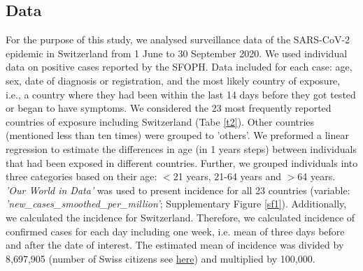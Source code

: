 \documentclass[10pt, a4paper, twoside]{article}
\begin{document}
\begin{multicols}{2}
\subsection{Data}
For the purpose of this study, we analysed surveillance data of the SARS-CoV-2 epidemic in Switzerland from 1 June to 30 September 2020. 
We used individual data on positive cases reported by the SFOPH. 
Data included for each case: age, sex, date of diagnosis or registration, and the most likely country of exposure, i.e., a country where they had been within the last 14 days before they got tested or began to have symptoms.
We considered the 23 most frequently reported countries of exposure including Switzerland (Tabe \ref{t2}).
Other countries (mentioned less than ten times) were grouped to 'others'.
We preformed a linear regression to estimate the differences in age (in 1 years steps) between individuals that had been exposed in different countries.
Further, we grouped individuals into three categories based on their age: $<$21 years, 21-64 years and  $>$64 years.
\textit{'Our World in Data'} was used to present incidence for all 23 countries (variable: \textit{'new\_cases\_smoothed\_per\_million'}; Supplementary Figure \ref{sf1}).\cite{hasell_cross-country_2020}
Additionally, we calculated the incidence for Switzerland.%
Therefore, we calculated incidence of confirmed cases for each day including one week, i.e. mean of three days before and after the date of interest.
The estimated mean of incidence was divided by 8,697,905 (number of Swiss citizens see \href{https://www.worldometers.info/world-population/switzerland-population/}{here}) and multiplied by 100,000.



\end{multicols}
\end{document}
